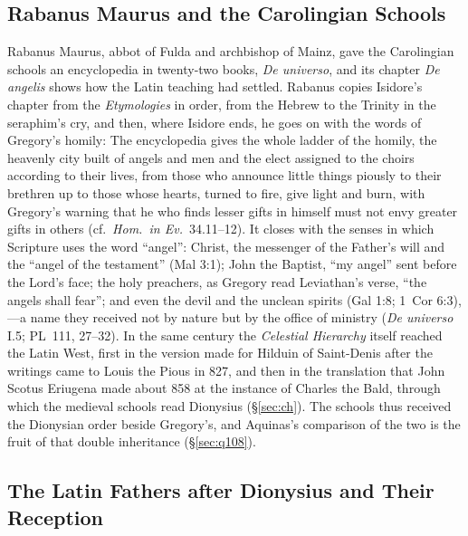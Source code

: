 \sectionguard
\subsection{Rabanus Maurus and the Carolingian Schools}\label{sec:fa-rabanus}

Rabanus Maurus, abbot of Fulda and archbishop of Mainz, gave the Carolingian
schools an encyclopedia in twenty-two books, \emph{De universo}, and its
chapter \emph{De angelis} shows how the Latin teaching had settled. Rabanus
copies Isidore's chapter from the \emph{Etymologies} in order, from the
Hebrew  to the Trinity in the seraphim's cry, and then,
where Isidore ends, he goes on with the words of Gregory's homily:
 The encyclopedia gives the whole ladder of the homily, the
heavenly city built of angels and men and the elect assigned to the choirs
according to their lives, from those who announce little things piously to
their brethren up to those whose hearts, turned to fire, give light and
burn, with Gregory's warning that he who finds lesser gifts in himself must
not envy greater gifts in others (cf.\ \emph{Hom.\ in Ev.}\ 34.11--12).
It closes with the senses in which Scripture uses the word ``angel'': Christ,
the messenger of the Father's will and the ``angel of the testament'' (Mal
3:1); John the Baptist, ``my angel'' sent before the Lord's face; the holy
preachers, as Gregory read Leviathan's verse, ``the angels shall fear''; and
even the devil and the unclean spirits (Gal 1:8; 1~Cor 6:3), ---a
name they received not by nature but by the office of ministry (\emph{De
universo} I.5; PL~111, 27--32). In the same century the \emph{Celestial
Hierarchy} itself reached the Latin West, first in the version made for
Hilduin of Saint-Denis after the writings came to Louis the Pious in 827, and
then in the translation that John Scotus Eriugena made about 858 at the
instance of Charles the Bald, through which the medieval schools read
Dionysius (\S\ref{sec:ch}). The schools thus received the Dionysian order
beside Gregory's, and Aquinas's comparison of the two is the fruit of that
double inheritance (\S\ref{sec:q108}).

\sectionguard
\subsection{The Latin Fathers after Dionysius and Their Reception}\label{sec:fa-reception}

